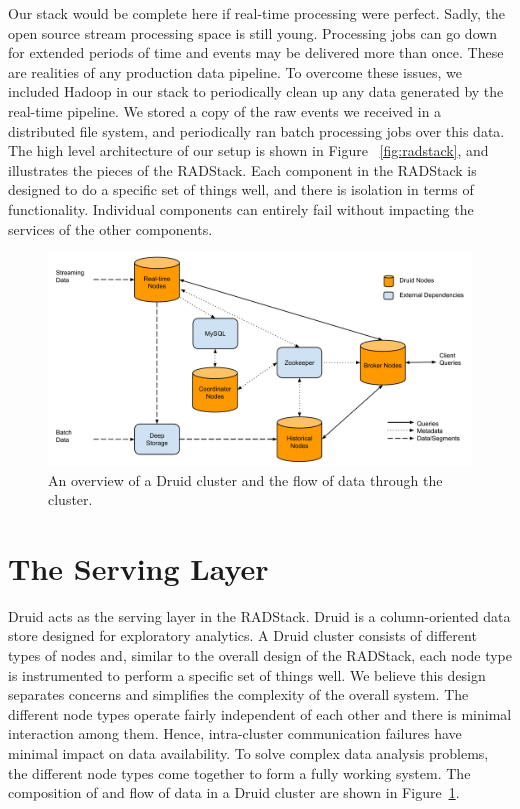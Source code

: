 \documentclass{vldb}
\begin{document}
Our stack would be complete here if real-time processing were perfect. Sadly,
the open source stream processing space is still young. Processing jobs can go
down for extended periods of time and events may be delivered more than once.
These are realities of any production data pipeline. To overcome these issues,
we included Hadoop in our stack to periodically clean up any data generated by
the real-time pipeline. We stored a copy of the raw events we received in a
distributed file system, and periodically ran batch processing jobs over this
data. The high level architecture of our setup is shown in Figure
~\ref{fig:radstack}, and illustrates the pieces of the RADStack. Each component
in the RADStack is designed to do a specific set of things well, and there is
isolation in terms of functionality. Individual components can entirely fail
without impacting the services of the other components.

\begin{figure}
\centering
\includegraphics[width = 4.5in]{cluster}
\caption{An overview of a Druid cluster and the flow of data through the cluster.}
\label{fig:cluster}
\end{figure}

\section{The Serving Layer}
\label{sec:serving}
Druid acts as the serving layer in the RADStack. Druid is a column-oriented
data store designed for exploratory analytics. A Druid cluster consists of
different types of nodes and, similar to the overall design of the RADStack,
each node type is instrumented to perform a specific set of things well. We
believe this design separates concerns and simplifies the complexity of the
overall system. The different node types operate fairly independent of each
other and there is minimal interaction among them. Hence, intra-cluster
communication failures have minimal impact on data availability. To solve
complex data analysis problems, the different node types come together to form
a fully working system. The composition of and flow of data in a Druid cluster
are shown in Figure~\ref{fig:cluster}.
\end{document}
